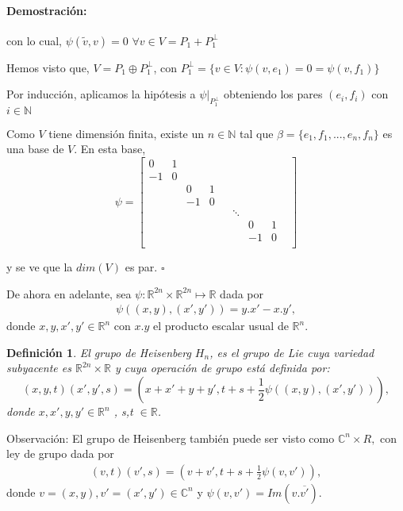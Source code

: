 \documentclass[12pt]{article}
\newtheorem{definition}{Definición}
\newenvironment{proof}{\paragraph{Demostración:}}{\hfill$\square$}
\begin{document}
\begin{proof}
 con lo cual, $\psi(\tilde{v},v)=0$ $\forall v \in V=P_1 + P_1^{\bot}$
 
 
Hemos visto que, $V=P_1 \oplus P_1^{\bot}$, con $P_1^{\bot}=\{v \in V : \psi(v,e_1)=0=\psi(v,f_1)\}$

Por inducción, aplicamos la hipótesis a $\psi|_{P_1^{\bot}}$ obteniendo los pares $(e_i,f_i)$ con $i \in \mathbb{N}$

Como $V$ tiene dimensión finita, existe un $n \in \mathbb{N}$ tal que  $\beta=\{e_1,f_1,...,e_n,f_n\}$ es una base de $V$.
En esta base, 
$$\psi = 
\begin{bmatrix}
 0 & 1 & & & & & & &\\ 
 -1& 0 & & & & & & &\\
 & & 0 & 1 & & & & &\\
 & & -1 & 0 & & & & &\\
 & &  &  & & \ddots & & &\\
 & &  &  & & & 0 & 1 &\\
 & &  &  & & & -1 & 0 &\\ 
\end{bmatrix}
$$

y se ve que la $dim(V)$ es par. 
\end{proof}
\newline


De ahora en adelante, sea $\psi :\mathbb{R}^{2n} \times \mathbb{R}^{2n}\mapsto \mathbb{R}$ dada por 
$$ \begin{aligned}
\psi((x,y),(x',y'))=y.x'-x.y' ,
\end{aligned}$$
donde $x,y,x',y' \in \mathbb{R}^n$ con  $x.y$ el producto escalar usual de $\mathbb{R}^n$.

\begin{definition}
 El grupo de Heisenberg $H_n$, es el grupo de Lie cuya variedad subyacente es $\mathbb{R}^{2n} \times \mathbb{R}$ y 
 cuya operación de grupo está definida por: 
 $$(x,y,t)(x',y',s)=(x+x'+y+y',t+s + \frac{1}{2} \psi((x,y),(x',y'))),$$
 donde $x,x',y,y' \in \mathbb{R}^{n}$ , s,t $\in \mathbb{R}$.
\end{definition}



Observación:
El grupo de Heisenberg también puede ser visto como  $\mathbb{C}^{n}\times R,$ con
ley de grupo dada por 
$$\begin{aligned}
(v,t)(v',s)=(v+v',t+s+ \frac{1}{2} \psi(v,v')),
\end{aligned}$$
donde $v=(x,y),v'=(x',y') \in \mathbb{C}^n$ y $\psi (v,v')=Im(v.\overline{v'}).$
\end{document}
